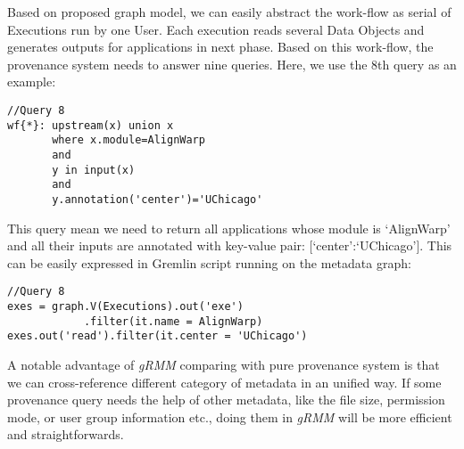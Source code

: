 Based on proposed graph model, we can easily abstract the work-flow as serial of Executions run by one User. Each execution reads several Data Objects and generates outputs for applications in next phase. Based on this work-flow, the provenance system needs to answer nine queries. Here, we use the 8th query as an example:

\begin{lstlisting}
//Query 8
wf{*}: upstream(x) union x
       where x.module=AlignWarp
       and
       y in input(x)
       and
       y.annotation('center')='UChicago'
\end{lstlisting}

This query mean we need to return all applications whose module is `AlignWarp' and all their inputs are annotated with key-value pair: [`center':`UChicago']. This can be easily expressed in Gremlin script running on the metadata graph:
\begin{lstlisting}
//Query 8
exes = graph.V(Executions).out('exe')
			.filter(it.name = AlignWarp)
exes.out('read').filter(it.center = 'UChicago')

\end{lstlisting}

A notable advantage of \textit{gRMM} comparing with pure provenance system is that we can cross-reference different category of metadata in an unified way. If some provenance query needs the help of other metadata, like the file size, permission mode, or user group information etc., doing them in \textit{gRMM} will be more efficient and straightforwards.